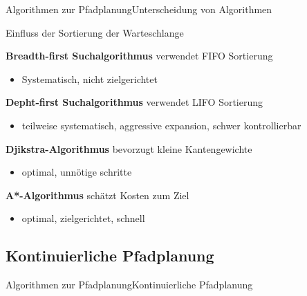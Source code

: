 \documentclass[t,aspectratio=169,dvipsnames]{beamer}
\begin{document}
\begin{frame}{Algorithmen zur Pfadplanung}{Unterscheidung von Algorithmen}
	
	\begin{center}
		Einfluss der Sortierung der Warteschlange
	\end{center}
	
	\textbf{Breadth-first Suchalgorithmus} verwendet FIFO Sortierung
	\begin{itemize}
		\item Systematisch, nicht zielgerichtet	
	\end{itemize}
	\textbf{Depht-first Suchalgorithmus} verwendet LIFO Sortierung
	\begin{itemize}
	\item teilweise systematisch, aggressive expansion, schwer kontrollierbar	
	\end{itemize}
	\textbf{Djikstra-Algorithmus} bevorzugt kleine Kantengewichte
	\begin{itemize}
		\item optimal, unnötige schritte
	\end{itemize}
	\textbf{A*-Algorithmus} schätzt Kosten zum Ziel
	\begin{itemize}
		\item optimal, zielgerichtet, schnell
	\end{itemize}	
\end{frame}

\subsection{Kontinuierliche Pfadplanung}
\begin{frame}{Algorithmen zur Pfadplanung}{Kontinuierliche Pfadplanung}
			
		
			
\end{frame}
\end{document}
